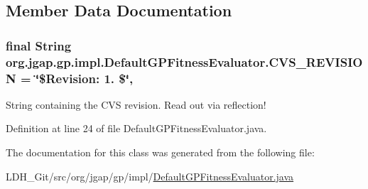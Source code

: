 \subsection{Member Data Documentation}
\hypertarget{classorg_1_1jgap_1_1gp_1_1impl_1_1_default_g_p_fitness_evaluator_abe516b191462d06da06c613050333e08}{
\subsubsection[{C\-V\-S\-\_\-\-R\-E\-V\-I\-S\-I\-O\-N}]{\setlength{\rightskip}{0pt plus 5cm}final String org.\-jgap.\-gp.\-impl.\-Default\-G\-P\-Fitness\-Evaluator.\-C\-V\-S\-\_\-\-R\-E\-V\-I\-S\-I\-O\-N = \char`\"{}\$Revision\-: 1. \$\char`\"{}\hspace{0.3cm}{\ttfamily [static]}, {\ttfamily [private]}}}\label{classorg_1_1jgap_1_1gp_1_1impl_1_1_default_g_p_fitness_evaluator_abe516b191462d06da06c613050333e08}
String containing the C\-V\-S revision. Read out via reflection! 

Definition at line 24 of file Default\-G\-P\-Fitness\-Evaluator.\-java.



The documentation for this class was generated from the following file\-:\begin{DoxyCompactItemize}
\item 
L\-D\-H\-\_\-\-Git/src/org/jgap/gp/impl/\hyperlink{_default_g_p_fitness_evaluator_8java}{Default\-G\-P\-Fitness\-Evaluator.\-java}\end{DoxyCompactItemize}
